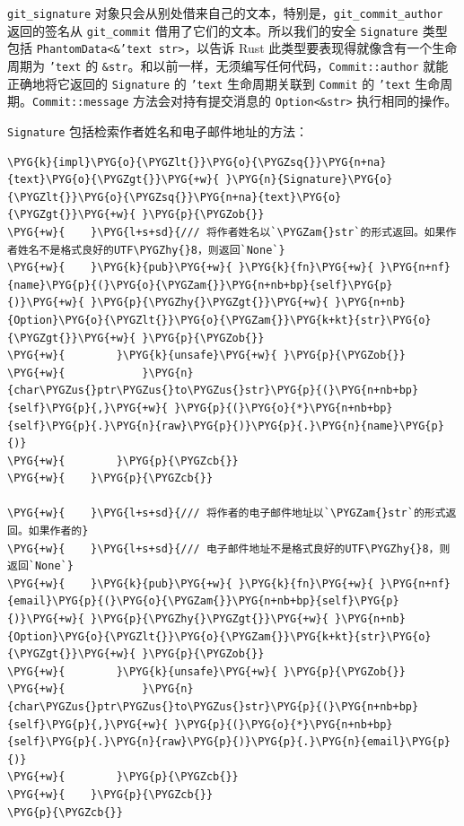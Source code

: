 \texttt{git\_signature} 对象只会从别处借来自己的文本，特别是，\texttt{git\_commit\_author} 返回的签名从 \texttt{git\_commit} 借用了它们的文本。所以我们的安全 \texttt{Signature} 类型包括 \texttt{PhantomData<\&'text str>}，以告诉 Rust 此类型要表现得就像含有一个生命周期为 \texttt{'text} 的 \texttt{\&str}。和以前一样，无须编写任何代码，\texttt{Commit::author} 就能正确地将它返回的 \texttt{Signature} 的 \texttt{'text} 生命周期关联到 \texttt{Commit} 的 \texttt{'text} 生命周期。\texttt{Commit::message} 方法会对持有提交消息的 \texttt{Option<\&str>} 执行相同的操作。

\texttt{Signature} 包括检索作者姓名和电子邮件地址的方法：

\begin{Verbatim}[commandchars=\\\{\},breaklines=true,breakanywhere=true,fontsize=\codefont,xleftmargin=17bp]
\PYG{k}{impl}\PYG{o}{\PYGZlt{}}\PYG{o}{\PYGZsq{}}\PYG{n+na}{text}\PYG{o}{\PYGZgt{}}\PYG{+w}{ }\PYG{n}{Signature}\PYG{o}{\PYGZlt{}}\PYG{o}{\PYGZsq{}}\PYG{n+na}{text}\PYG{o}{\PYGZgt{}}\PYG{+w}{ }\PYG{p}{\PYGZob{}}
\PYG{+w}{    }\PYG{l+s+sd}{/// 将作者姓名以`\PYGZam{}str`的形式返回。如果作者姓名不是格式良好的UTF\PYGZhy{}8，则返回`None`}
\PYG{+w}{    }\PYG{k}{pub}\PYG{+w}{ }\PYG{k}{fn}\PYG{+w}{ }\PYG{n+nf}{name}\PYG{p}{(}\PYG{o}{\PYGZam{}}\PYG{n+nb+bp}{self}\PYG{p}{)}\PYG{+w}{ }\PYG{p}{\PYGZhy{}\PYGZgt{}}\PYG{+w}{ }\PYG{n+nb}{Option}\PYG{o}{\PYGZlt{}}\PYG{o}{\PYGZam{}}\PYG{k+kt}{str}\PYG{o}{\PYGZgt{}}\PYG{+w}{ }\PYG{p}{\PYGZob{}}
\PYG{+w}{        }\PYG{k}{unsafe}\PYG{+w}{ }\PYG{p}{\PYGZob{}}
\PYG{+w}{            }\PYG{n}{char\PYGZus{}ptr\PYGZus{}to\PYGZus{}str}\PYG{p}{(}\PYG{n+nb+bp}{self}\PYG{p}{,}\PYG{+w}{ }\PYG{p}{(}\PYG{o}{*}\PYG{n+nb+bp}{self}\PYG{p}{.}\PYG{n}{raw}\PYG{p}{)}\PYG{p}{.}\PYG{n}{name}\PYG{p}{)}
\PYG{+w}{        }\PYG{p}{\PYGZcb{}}
\PYG{+w}{    }\PYG{p}{\PYGZcb{}}

\PYG{+w}{    }\PYG{l+s+sd}{/// 将作者的电子邮件地址以`\PYGZam{}str`的形式返回。如果作者的}
\PYG{+w}{    }\PYG{l+s+sd}{/// 电子邮件地址不是格式良好的UTF\PYGZhy{}8，则返回`None`}
\PYG{+w}{    }\PYG{k}{pub}\PYG{+w}{ }\PYG{k}{fn}\PYG{+w}{ }\PYG{n+nf}{email}\PYG{p}{(}\PYG{o}{\PYGZam{}}\PYG{n+nb+bp}{self}\PYG{p}{)}\PYG{+w}{ }\PYG{p}{\PYGZhy{}\PYGZgt{}}\PYG{+w}{ }\PYG{n+nb}{Option}\PYG{o}{\PYGZlt{}}\PYG{o}{\PYGZam{}}\PYG{k+kt}{str}\PYG{o}{\PYGZgt{}}\PYG{+w}{ }\PYG{p}{\PYGZob{}}
\PYG{+w}{        }\PYG{k}{unsafe}\PYG{+w}{ }\PYG{p}{\PYGZob{}}
\PYG{+w}{            }\PYG{n}{char\PYGZus{}ptr\PYGZus{}to\PYGZus{}str}\PYG{p}{(}\PYG{n+nb+bp}{self}\PYG{p}{,}\PYG{+w}{ }\PYG{p}{(}\PYG{o}{*}\PYG{n+nb+bp}{self}\PYG{p}{.}\PYG{n}{raw}\PYG{p}{)}\PYG{p}{.}\PYG{n}{email}\PYG{p}{)}
\PYG{+w}{        }\PYG{p}{\PYGZcb{}}
\PYG{+w}{    }\PYG{p}{\PYGZcb{}}
\PYG{p}{\PYGZcb{}}
\end{Verbatim}

